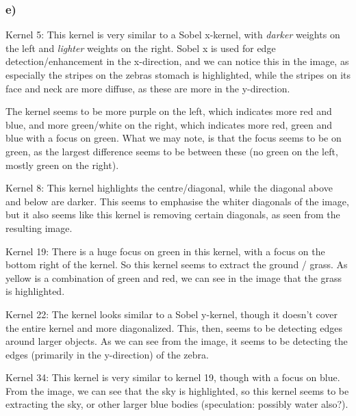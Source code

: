 \subsubsection*{e)}
Kernel 5: 
This kernel is very similar to a Sobel x-kernel, with \textit{darker} weights on the left and \textit{lighter} weights on the right. Sobel x is used for edge detection/enhancement in the x-direction, and we can notice this in the image, as especially the stripes on the zebras stomach is highlighted, while the stripes on its face and neck are more diffuse, as these are more in the y-direction. 

The kernel seems to be more purple on the left, which indicates more red and blue, and more green/white on the right, which indicates more red, green and blue with a focus on green. What we may note, is that the focus seems to be on green, as the largest difference seems to be between these (no green on the left, mostly green on the right). 

Kernel 8: 
This kernel highlights the centre/diagonal, while the diagonal above and below are darker. This seems to emphasise the whiter diagonals of the image, but it also seems like this kernel is removing certain diagonals, as seen from the resulting image. 

Kernel 19: 
There is a huge focus on green in this kernel, with a focus on the bottom right of the kernel. So this kernel seems to extract the ground / grass. As yellow is a combination of green and red, we can see in the image that the grass is highlighted. 

Kernel 22: 
The kernel looks similar to a Sobel y-kernel, though it doesn't cover the entire kernel and more diagonalized.  This, then, seems to be detecting edges around larger objects. As we can see from the image, it seems to be detecting the edges (primarily in the y-direction) of the zebra. 

Kernel 34: 
This kernel is very similar to kernel 19, though with a focus on blue. From the image, we can see that the sky is highlighted, so this kernel seems to be extracting the sky, or other larger blue bodies (speculation: possibly water also?). 

